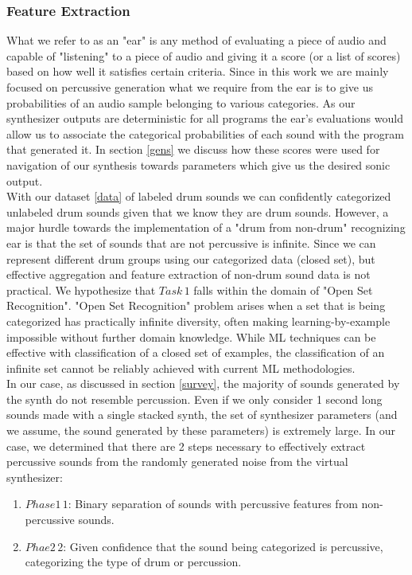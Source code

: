 \documentclass{nime-alternate} %
\begin{document}
\subsubsection{Feature Extraction}
What we refer to as an "ear" is any method of evaluating a piece of audio and capable of "listening" to a piece of audio and giving it a score (or a list of scores) based on how well it satisfies certain criteria. Since in this work we are mainly focused on percussive generation what we require from the ear is to give us probabilities of an audio sample belonging to various categories. As our synthesizer outputs are deterministic for all programs the ear's evaluations would allow us to associate the categorical probabilities of each sound with the program that generated it. In section \ref{gens} we discuss how these scores were used for navigation of our synthesis towards parameters which give us the desired sonic output.\\
 With our dataset \ref{data} of labeled drum sounds we can confidently categorized unlabeled drum sounds given that we know they are drum sounds. However, a major hurdle towards the implementation of a "drum from non-drum" recognizing ear is that the set of sounds that are not percussive is infinite. Since we can represent different drum groups using our categorized data (closed set), but effective aggregation and feature extraction of non-drum sound data is not practical. We hypothesize that $Task\,1$ falls within the domain of "Open Set Recognition"\cite{scheirer2012toward}. "Open Set Recognition" problem arises when a set that is being categorized has practically infinite diversity, often making learning-by-example impossible without further domain knowledge. While ML techniques can be effective with classification of a closed set of examples, the classification of an infinite set cannot be reliably achieved with current ML methodologies\cite{geng2018recent,mundt2019open}. \\
  In our case, as discussed in section \ref{survey}, the majority of sounds generated by the synth do not resemble percussion. Even if we only consider 1 second long sounds made with a single stacked synth, the set of synthesizer parameters (and we assume, the sound generated by these parameters) is extremely large. In our case, we determined that there are 2 steps necessary to effectively extract percussive sounds from the randomly generated noise from the virtual synthesizer: 
  \begin{enumerate}
   \item  $Phase1\,1$: Binary separation of sounds with percussive features from non-percussive sounds.
   \item $Phae2\,2$: Given confidence that the sound being categorized is percussive, categorizing the type of drum or percussion.
 \end{enumerate}
\end{document}
